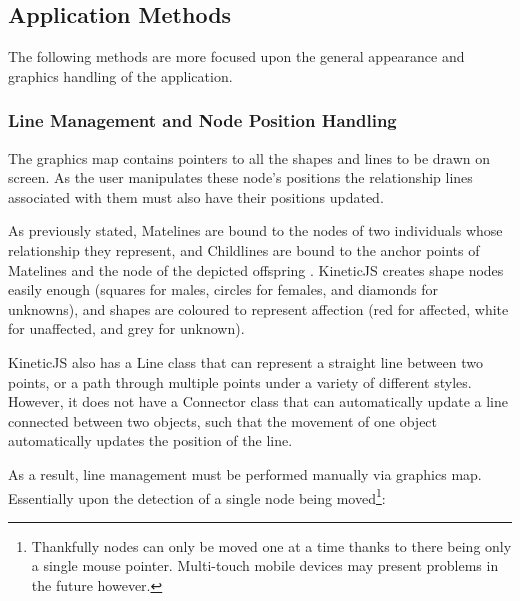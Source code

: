 \subsection{Application Methods}

The following methods are more focused upon the general appearance and graphics handling of the application.

\subsubsection{Line Management and Node Position Handling}

The graphics map contains pointers to all the shapes and lines to be drawn on screen. As the user manipulates these node’s positions the relationship lines associated with them must also have their positions updated.

As previously stated,  Matelines are bound to the nodes of two individuals whose relationship they represent, and Childlines are bound to the anchor points of Matelines and the node of the depicted offspring .
KineticJS creates shape nodes easily enough (squares for males, circles for females, and diamonds for unknowns), and shapes are coloured to represent affection (red for affected, white for unaffected, and grey for unknown).

KineticJS also has a Line class that can represent a straight line between two points, or a path through multiple points under a variety of different styles. However, it does not have a Connector class that can automatically update a line connected between two objects, such that the movement of one object automatically updates the position of the line.

As a result, line management must be performed manually via graphics map. Essentially upon the detection of a single node being moved\footnote{Thankfully nodes can only be moved one at a time thanks to there being only a single mouse pointer. Multi-touch mobile devices may present problems in the future however.}:

\begin{enumerate}
\end{enumerate}

